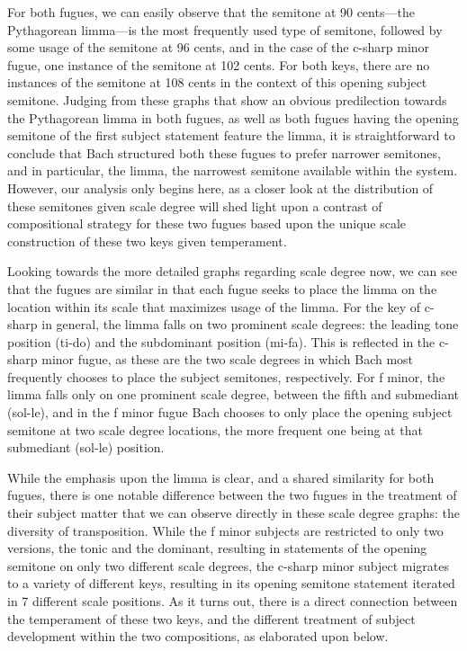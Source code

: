     \begin{center}
    \end{center}
    

    \begin{center}
    \end{center}
    
    For both fugues, we can easily observe that the semitone at 90
cents---the Pythagorean limma---is the most frequently used type
of semitone, followed by some usage of the semitone at 96 cents, and in
the case of the c-sharp minor fugue, one instance of the semitone at 102
cents. For both keys, there are no instances of the semitone at 108
cents in the context of this opening subject semitone. Judging from
these graphs that show an obvious predilection towards the Pythagorean
limma in both fugues, as well as both fugues having the opening semitone
of the first subject statement feature the limma, it is straightforward
to conclude that Bach structured both these fugues to prefer narrower
semitones, and in particular, the limma, the narrowest semitone
available within the system. However, our analysis only begins here, as
a closer look at the distribution of these semitones given scale degree
will shed light upon a contrast of compositional strategy for these two
fugues based upon the unique scale construction of these two keys given
temperament.

Looking towards the more detailed graphs regarding scale degree now, we
can see that the fugues are similar in that each fugue seeks to place
the limma on the location within its scale that maximizes usage of the
limma. For the key of c-sharp in general, the limma falls on two
prominent scale degrees: the leading tone position (ti-do) and the
subdominant position (mi-fa). This is reflected in the c-sharp minor
fugue, as these are the two scale degrees in which Bach most frequently
chooses to place the subject semitones, respectively. For f minor, the
limma falls only on one prominent scale degree, between the fifth and
submediant (sol-le), and in the f minor fugue Bach chooses to only place
the opening subject semitone at two scale degree locations, the more
frequent one being at that submediant (sol-le) position.

While the emphasis upon the limma is clear, and a shared similarity for
both fugues, there is one notable difference between the two fugues in
the treatment of their subject matter that we can observe directly in
these scale degree graphs: the diversity of transposition. While the f
minor subjects are restricted to only two versions, the tonic and the
dominant, resulting in statements of the opening semitone on only two
different scale degrees, the c-sharp minor subject migrates to a variety
of different keys, resulting in its opening semitone statement iterated
in 7 different scale positions. As it turns out, there is a direct
connection between the temperament of these two keys, and the different
treatment of subject development within the two compositions, as
elaborated upon below.

